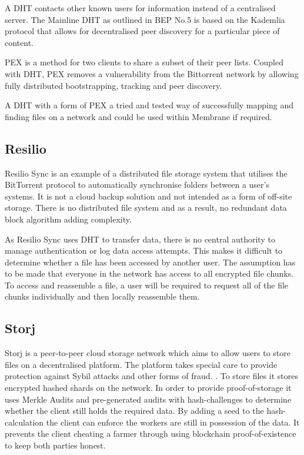 \documentclass[11pt, a4paper, twocolumn, twoside]{report}
\begin{document}
A DHT contacts other known users for information instead of a centralised server. The Mainline DHT as outlined in BEP No.5 is based on the Kademlia protocol that allows for decentralised peer discovery for a particular piece of content.

PEX is a method for two clients to share a subset of their peer lists. Coupled with DHT, PEX removes a vulnerability from the Bittorrent network by allowing fully distributed bootstrapping, tracking and peer discovery.

A DHT with a form of PEX a tried and tested way of successfully mapping and finding files on a network and could be used within Membrane if required.

\subsection{Resilio}

Resilio Sync is an example of a distributed file storage system that utilises the BitTorrent protocol to automatically synchronise folders between a user’s systems. It is not a cloud backup solution and not intended as a form of off-site storage. There is no distributed file system and as a result, no redundant data block algorithm adding complexity. \citep{farina2014bittorrent}

As Resilio Sync uses DHT to transfer data, there is no central authority to manage authentication or log data access attempts. This makes it difficult to determine whether a file has been accessed by another user. \citep{farina2014bittorrent} The assumption has to be made that everyone in the network has access to all encrypted file chunks. To access and reassemble a file, a user will be required to request all of the file chunks individually and then locally reassemble them.

\subsection{Storj}

Storj is a peer-to-peer cloud storage network which aims to allow users to store files on a decentralised platform. The platform takes special care to provide protection against Sybil attacks and other forms of fraud. \citep{Wilkinson14storja}. To store files it stores encrypted hashed shards on the network. In order to provide proof-of-storage it uses Merkle Audits and pre-generated audits with hash-challenges to determine whether the client still holds the required data. By adding a seed to the hash-calculation the client can enforce the workers are still in possession of the data. It prevents the client cheating a farmer through using blockchain proof-of-existence to keep both parties honest.
\end{document}
